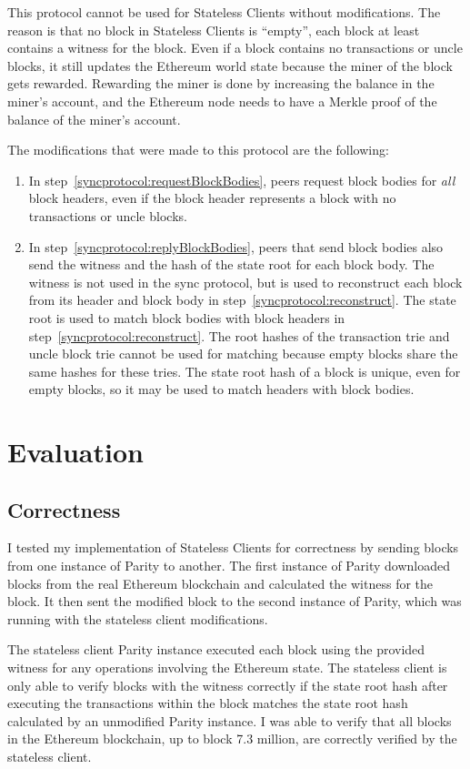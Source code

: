 \documentclass[12pt]{article}
\newcounter{protocol}
\newcommand{\System}{Stateless Clients\xspace}
\begin{document}
This protocol cannot be used for \System without modifications. The reason is that no block in \System is ``empty'', each block at least contains a witness for the block. Even if a block contains no transactions or uncle blocks, it still updates the Ethereum world state because the miner of the block gets rewarded. Rewarding the miner is done by increasing the balance in the miner's account, and the Ethereum node needs to have a Merkle proof of the balance of the miner's account.

The modifications that were made to this protocol are the following:
\begin{enumerate}
  \item In step~\ref{syncprotocol:requestBlockBodies}, peers request block bodies for \emph{all} block headers, even if the block header represents a block with no transactions or uncle blocks.
  \item In step~\ref{syncprotocol:replyBlockBodies}, peers that send block bodies also send the witness and the hash of the state root for each block body. The witness is not used in the sync protocol, but is used to reconstruct each block from its header and block body in step~\ref{syncprotocol:reconstruct}. The state root is used to match block bodies with block headers in step~\ref{syncprotocol:reconstruct}. The root hashes of the transaction trie and uncle block trie cannot be used for matching because empty blocks share the same hashes for these tries. The state root hash of a block is unique, even for empty blocks, so it may be used to match headers with block bodies.
\end{enumerate}


\section{Evaluation}

\subsection{Correctness}

I tested my implementation of \System for correctness by sending blocks from one instance of Parity to another. The first instance of Parity downloaded blocks from the real Ethereum blockchain and calculated the witness for the block. It then sent the modified block to the second instance of Parity, which was running with the stateless client modifications.

The stateless client Parity instance executed each block using the provided witness for any operations involving the Ethereum state. The stateless client is only able to verify blocks with the witness correctly if the state root hash after executing the transactions within the block matches the state root hash calculated by an unmodified Parity instance. I was able to verify that all blocks in the Ethereum blockchain, up to block 7.3 million, are correctly verified by the stateless client.
\end{document}
